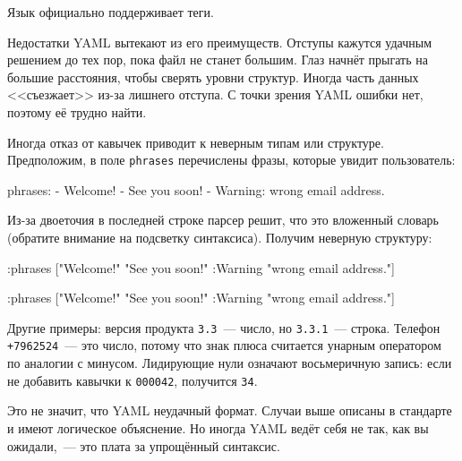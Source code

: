 \fi

Язык официально поддерживает теги.


Недостатки YAML вытекают из его преимуществ. Отступы кажутся удачным решением до
тех пор, пока файл не станет большим. Глаз начнёт прыгать на большие расстояния,
чтобы сверять уровни структур. Иногда часть данных <<съезжает>> из-за лишнего
отступа. С точки зрения YAML ошибки нет, поэтому её трудно найти.

Иногда отказ от кавычек приводит к неверным типам или структуре. Предположим, в
поле \verb|phrases| перечислены фразы, которые увидит пользователь:

\begin{english}
  \begin{yaml}
phrases:
  - Welcome!
  - See you soon!
  - Warning: wrong email address.
  \end{yaml}
\end{english}

Из-за двоеточия в последней строке парсер решит, что это вложенный словарь
(обратите внимание на подсветку синтаксиса). Получим неверную структуру:

\ifx\DEVICETYPE\MOBILE

\begin{english}
  \begin{clojure}
{:phrases
 ["Welcome!"
  "See you soon!"
  {:Warning "wrong email address."}]}
  \end{clojure}
\end{english}

\else

\begin{english}
  \begin{clojure}
{:phrases ["Welcome!"
           "See you soon!"
           {:Warning "wrong email address."}]}
  \end{clojure}
\end{english}

\fi

Другие примеры: версия продукта \verb|3.3|~--- число, но \verb|3.3.1|~---
строка. Телефон \texttt{+7962524}~--- это число, потому что знак плюса
считается унарным оператором по аналогии с минусом. Лидирующие нули означают
восьмеричную запись: если не добавить кавычки к \verb|000042|, получится
\verb|34|.

Это не значит, что YAML неудачный формат. Случаи выше описаны в стандарте и
имеют логическое объяснение. Но иногда YAML ведёт себя не так, как вы
ожидали,~--- это плата за упрощённый синтаксис.

